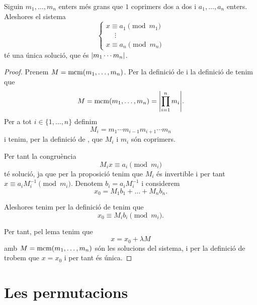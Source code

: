 \documentclass[../../Main.tex]{subfiles}
\begin{document}
	\begin{theorem}
		\label{thm:TXR}\label{thm:Teorema xinès de les restes}
		Siguin \(m_{1},\dots,m_{n}\) enters més grans que \(1\) coprimers dos a dos i \(a_{1},\dots,a_{n}\) enters. Aleshores el sistema
		\[\begin{cases}
		x\equiv a_{1}\pmod{m_{1}}\\
		\quad\ \vdots\\
		x\equiv a_{n}\pmod{m_{n}}
		\end{cases}\]
		té una única solució, que és \(\abs{m_{1}\cdots m_{n}}\).
		\begin{proof}
			Prenem \(M=\operatorname{mcm}(m_{1},\dots,m_{n})\). Per la definició de  i la definició de  tenim que \[M=\mcm(m_{1},\dots,m_{n})=\abs{\prod_{i=1}^{n}m_{i}}.\]
			Per a tot \(i\in\{1,\dots,n\}\) definim
			\[M_{i}=m_{1}\cdots m_{i-1}m_{i+1}\cdots m_{n}\]
			i tenim, per la definició de , que \(M_{i}\) i \(m_{i}\) són coprimers.
			
			Per tant la congruència
			\[M_{i}x\equiv a_{i}\pmod{m_{i}}\]
			té solució, ja que per la proposició  tenim que \(M_{i}\) és invertible i per tant \(x\equiv a_{i}M_{i}^{-1}\pmod{m_{i}}\). Denotem \(b_{i}=a_{i}M_{i}^{-1}\) i considerem
			\[x_{0}=M_{1}b_{1}+\dots+M_{n}b_{n}.\]
			
			Aleshores tenim per la definició de  tenim que
			\[x_{0}\equiv M_{i}b_{i}\pmod{m_{i}}.\]
			
			Per tant, pel lema  tenim que
			\[x=x_{0}+\lambda M\]
			amb \(M=\operatorname{mcm}(m_{1},\dots,m_{n})\) són les solucions del sistema, i per la definició de  trobem que \(x=x_{0}\) i per tant és única.
		\end{proof}
	\end{theorem}
\section{Les permutacions}
\end{document}
